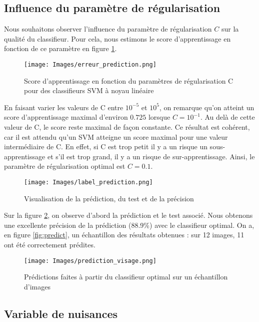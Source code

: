 \documentclass[a4paper,12pt]{article}
\begin{document}
\subsection{Influence du paramètre de régularisation}

Nous souhaitons observer l'influence du paramètre de régularisation $C$ sur la qualité du classifieur. 
Pour cela, nous estimons le score d'apprentissage en fonction de ce paramètre en figure \ref{fig : C}.

\begin{figure}[H]
        \centering
        \texttt{[image: Images/erreur\_prediction.png]}
        \caption{Score d'apprentissage en fonction du paramètres de régularisation C pour des classifieurs SVM à noyau linéaire}
        \label{fig : C}
\end{figure}

En faisant varier les valeurs de C entre $10^{-5}$ et $10^{5}$, on remarque qu'on atteint un score d'apprentissage maximal d'environ $0.725$ lorsque $C=10^{-1}$.
Au delà de cette valeur de C, le score reste maximal de façon constante.
Ce résultat est cohérent, car il est attendu qu’un SVM atteigne un score maximal pour une valeur intermédiaire de 
C. En effet, si C est trop petit il y a un risque un sous-apprentissage et s'il est trop grand, il y a un risque de sur-apprentissage.
Ainsi, le paramètre de régularisation optimal est $C=0.1$.


\begin{figure}[H]    
        \centering    
        \texttt{[image: Images/label\_prediction.png]}
        \caption{Visualisation de la prédiction, du test et de la précision}
        \label{fig:precision}
\end{figure}

Sur la figure \ref{fig:precision}, on observe d'abord la prédiction et le test associé.
Nous obtenons une excellente précision de la prédiction (88.9\%) avec le classifieur optimal. 
On a, en figure \ref{fig:predict}, un échantillon des résultats obtenues : sur 12 images, 11 ont été correctement prédites.

\begin{figure}[H]
    \centering
    \texttt{[image: Images/prediction\_visage.png]}
    \caption{Prédictions faites à partir du classifieur optimal sur un échantillon d'images}
    \label{ref:predict}
\end{figure}

\subsection{Variable de nuisances}
\end{document}
